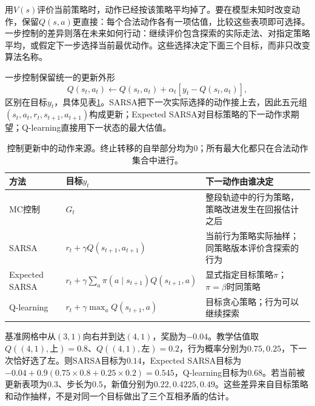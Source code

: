 用$V(s)$评价当前策略时，动作已经按该策略平均掉了。要在模型未知时改变动作，保留$Q(s,a)$更直接：每个合法动作各有一项估值，比较这些表项即可选择。一步控制的差异则落在未来如何行动：继续评价包含探索的实际走法、对指定策略平均，或假定下一步选择当前最优动作。这些选择决定下面三个目标，而非只改变算法名称。

一步控制保留统一的更新外形
\begin{equation}
  Q(s_t,a_t)\leftarrow Q(s_t,a_t)
        +\alpha_t[y_t-Q(s_t,a_t)],
  \label{eq:rl-learning-control-update}
\end{equation}
区别在目标$y_t$，具体见表\ref{tab:rl-learning-control-targets}。SARSA把下一次实际选择的动作接上去，因此五元组$(s_t,a_t,r_t,s_{t+1},a_{t+1})$构成更新；Expected SARSA对目标策略的下一动作求期望；Q-learning直接用下一状态的最大估值。

\begin{table}[t]
  \centering
  \small
  \begin{tabularx}{\linewidth}{>{\raggedright\arraybackslash}p{28mm} >{\raggedright\arraybackslash}X >{\raggedright\arraybackslash}X}
    \toprule
    方法 & 目标$y_t$ & 下一动作由谁决定 \\
    \midrule
    MC控制 & $G_t$ & 整段轨迹中的行为策略，策略改进发生在回报估计之后 \\
    SARSA & $r_t+\gamma Q(s_{t+1},a_{t+1})$ & 当前行为策略实际抽样；同策略版本评价含探索的行为 \\
    Expected SARSA & $r_t+\gamma\sum_a\pi(a\mid s_{t+1})Q(s_{t+1},a)$ & 显式指定目标策略$\pi$；$\pi=\beta$时同策略 \\
    Q-learning & $r_t+\gamma\max_aQ(s_{t+1},a)$ & 目标贪心策略；行为可以继续探索 \\
    \bottomrule
  \end{tabularx}
  \caption{控制更新中的动作来源。终止转移的自举部分均为0；所有最大化都只在合法动作集合中进行。}
  \label{tab:rl-learning-control-targets}
\end{table}

\begin{example}
  \label{ex:rl-learning-sarsa-q}
  基准网格中从$(3,1)$向右并到达$(4,1)$，奖励为$-0.04$。教学估值取$Q((4,1),\text{上})=0.8$、$Q((4,1),\text{左})=0.2$，行为概率分别为$0.75,0.25$，下一次恰好选了左。则SARSA目标为$0.14$，Expected SARSA目标为$-0.04+0.9(0.75\times0.8+0.25\times0.2)=0.545$，Q-learning目标为$0.68$。若当前被更新表项为$0.3$、步长为$0.5$，新值分别为$0.22,0.4225,0.49$。这些差异来自目标策略和动作抽样，不是对同一个目标做出了三个互相矛盾的估计。
\end{example}

